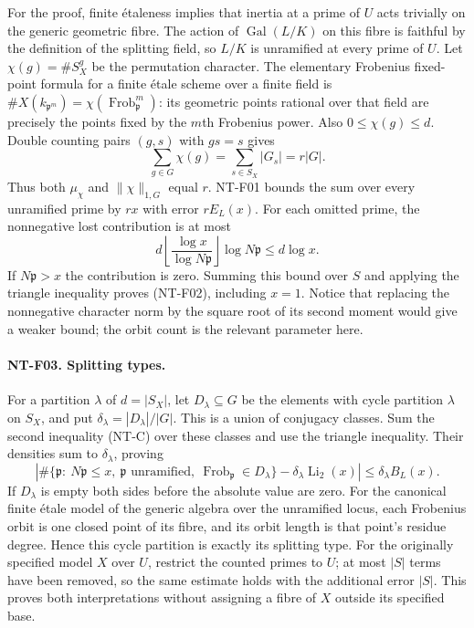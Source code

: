 For the proof, finite \'{e}taleness implies that inertia at a prime of $U$
acts trivially on the generic geometric fibre.  The action of
$\operatorname{Gal}(L/K)$ on this fibre is faithful by the definition of
the splitting field, so $L/K$ is unramified at every prime of $U$.
Let $\chi(g)=\#S_X^g$ be the permutation character.  The elementary
Frobenius fixed-point formula for a finite \'{e}tale scheme over a finite
field is
$\#X(k_{\mathfrak p^m})=\chi(\operatorname{Frob}_{\mathfrak p}^{m})$:
its geometric points rational over that field are precisely the points
fixed by the $m$th Frobenius power.  Also $0\le\chi(g)\le d$.
Double counting pairs $(g,s)$ with $gs=s$ gives
\[
 \sum_{g\in G}\chi(g)=\sum_{s\in S_X}|G_s|=r|G|.
\]
Thus both $\mu_\chi$ and $\|\chi\|_{1,G}$ equal $r$.  NT-F01 bounds
the sum over every unramified prime by $rx$ with error $rE_L(x)$.
For each omitted prime, the nonnegative lost contribution is at most
\[
 d\left\lfloor\frac{\log x}{\log N\mathfrak p}\right\rfloor
          \log N\mathfrak p\le d\log x.
\]
If $N\mathfrak p>x$ the contribution is zero.  Summing this bound over
$S$ and applying the triangle inequality proves (NT-F02), including
$x=1$.  Notice that replacing the nonnegative character norm by the square
root of its second moment would give a weaker bound; the orbit count is
the relevant parameter here.

\paragraph{NT-F03. Splitting types.}
For a partition $\lambda$ of $d=|S_X|$, let $D_\lambda\subseteq G$ be
the elements with cycle partition $\lambda$ on $S_X$, and put
$\delta_\lambda=|D_\lambda|/|G|$.  This is a union of conjugacy classes.
Sum the second inequality (NT-C) over these classes and use the triangle
inequality.  Their densities sum to $\delta_\lambda$, proving
\[
 \left|\#\{\mathfrak p:\ N\mathfrak p\le x,\ \mathfrak p
 \text{ unramified},\ \operatorname{Frob}_{\mathfrak p}\in D_\lambda\}
 -\delta_\lambda\operatorname{Li}_2(x)\right|
 \le\delta_\lambda B_L(x).
\]
If $D_\lambda$ is empty both sides before the absolute value are zero.
For the canonical finite \'{e}tale model of the generic algebra over the
unramified locus, each Frobenius orbit is one closed point of its fibre,
and its orbit length is that point's residue degree.  Hence this cycle
partition is exactly its splitting type.  For the originally specified
model $X$ over $U$, restrict the counted primes to $U$; at most $|S|$
terms have been removed, so the same estimate holds with the additional
error $|S|$.  This proves both interpretations without assigning a fibre
of $X$ outside its specified base.

